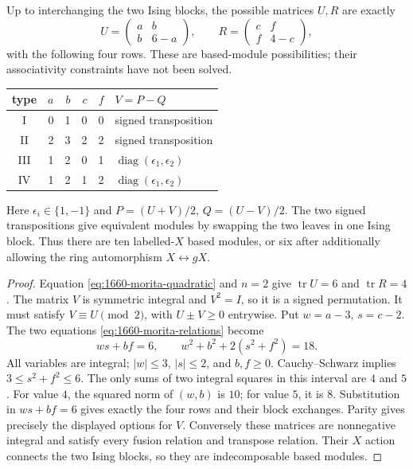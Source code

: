 \begin{theorem}
Up to interchanging the two Ising blocks, the possible matrices $U,R$
are exactly
\[
U=\begin{pmatrix}a&b\\b&6-a\end{pmatrix},\qquad
R=\begin{pmatrix}c&f\\f&4-c\end{pmatrix},
\]
with the following four rows. These are based-module possibilities;
their associativity constraints have not been solved.
\begin{center}
\begin{tabular}{c|rrrr|l}
type&$a$&$b$&$c$&$f$&$V=P-Q$\\\hline
I&0&1&0&0&signed transposition\\
II&2&3&2&2&signed transposition\\
III&1&2&0&1&$\operatorname{diag}(\epsilon_1,\epsilon_2)$\\
IV&1&2&1&2&$\operatorname{diag}(\epsilon_1,\epsilon_2)$
\end{tabular}
\end{center}
Here $\epsilon_i\in\{1,-1\}$ and $P=(U+V)/2$, $Q=(U-V)/2$.
The two signed transpositions give equivalent modules by swapping the
two leaves in one Ising block. Thus there are ten labelled-$X$ based
modules, or six after additionally allowing the ring automorphism
$X\leftrightarrow gX$.
\end{theorem}
\begin{proof}
Equation \eqref{eq:1660-morita-quadratic} and $n=2$ give $\operatorname{tr}U=6$ and
$\operatorname{tr}R=4$. The matrix $V$ is symmetric integral and
$V^2=I$, so it is a signed permutation. It must satisfy
$V\equiv U\pmod2$, with $U\pm V\geq0$ entrywise.
Put $w=a-3$, $s=c-2$. The two equations \eqref{eq:1660-morita-relations} become
\begin{equation}
ws+bf=6,\qquad w^2+b^2+2(s^2+f^2)=18. \label{eq:1660-morita-small-squares}
\end{equation}
All variables are integral; $|w|\leq3$, $|s|\leq2$, and $b,f\geq0$.
Cauchy--Schwarz implies $3\leq s^2+f^2\leq6$.
The only sums of two integral squares in this interval are $4$ and $5$.
For value $4$, the squared norm of $(w,b)$ is $10$; for value $5$, it
is $8$. Substitution in $ws+bf=6$ gives exactly the four rows and their
block exchanges. Parity gives precisely the displayed options for $V$.
Conversely these matrices are nonnegative integral and satisfy every
fusion relation and transpose relation. Their $X$ action connects the
two Ising blocks, so they are indecomposable based modules.
\end{proof}

